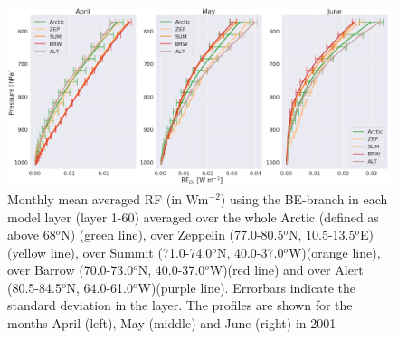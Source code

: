 \begin{figure}[ht]
    \centering
    \includegraphics[width = \linewidth]{Chapter6_Results/images/RF/vert_RF_AprJune_2001.png}
    \caption{Monthly mean averaged RF (in Wm$^{-2}$) using the BE-branch in each model layer (layer 1-60) averaged over the whole Arctic (defined as above 68$^o$N) (green line), over Zeppelin (77.0-80.5$^o$N, 10.5-13.5$^o$E) (yellow line), over Summit (71.0-74.0$^o$N, 40.0-37.0$^o$W)(orange line), over Barrow (70.0-73.0$^o$N, 40.0-37.0$^o$W)(red line) and over Alert (80.5-84.5$^o$N, 64.0-61.0$^o$W)(purple line). Errorbars indicate the standard deviation in the layer. The profiles are shown for the months April (left), May (middle) and June (right) in 2001}
    \label{fig:vert_RF_AprJune_2001}
\end{figure}


